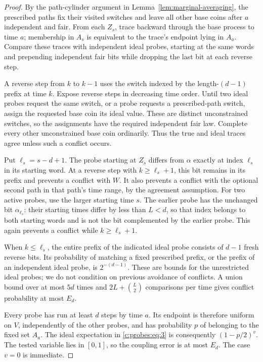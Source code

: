 \begin{proof}
\label{c:probes:p010}
By the path-cylinder argument in Lemma~\ref{lem:marginal-averaging},
the prescribed paths fix their visited switches and leave all other
base coins after $a$ independent and fair.
From each $Z_s$, trace backward through the base process to time $a$;
membership in $A_s$ is equivalent to the trace's endpoint lying in
$A_a$. Compare these traces with independent ideal probes, starting
at the same words and prepending independent fair bits while dropping
the last bit at each reverse step.

\label{c:probes:p011}
A reverse step from $k$ to $k-1$ uses the switch indexed by the
length-$(d-1)$ prefix at time $k$. Expose reverse steps in decreasing
time order. Until two ideal probes request the same switch, or a probe
requests a prescribed-path switch, assign the requested base coin its
ideal value. These are distinct unconstrained switches, so the
assignments have the required independent fair law. Complete every
other unconstrained base coin ordinarily. Thus the true and ideal
traces agree unless such a conflict occurs.

\label{c:probes:p012}
Put $\ell_s=s-d+1$. The probe starting at $Z_s$ differs from
$\alpha$ exactly at index $\ell_s$ in its starting word. At a reverse
step with $k\ge\ell_s+1$, this bit remains in its prefix and prevents
a conflict with $W$. It also prevents a conflict with the optional
second path in that path's time range, by the agreement assumption.
For two active probes, use the larger starting time $s$. The earlier
probe has the unchanged bit $\alpha_{\ell_s}$: their starting times
differ by less than $L<d$, so that index belongs to both starting
words and is not the bit complemented by the earlier probe. This again
prevents a conflict while $k\ge\ell_s+1$.

When $k\le\ell_s$, the entire prefix of the indicated ideal probe
consists of $d-1$ fresh reverse bits. Its probability of matching a
fixed prescribed prefix, or the prefix of an independent ideal probe,
is $2^{-(d-1)}$. These are bounds for the unrestricted ideal probes;
we do not condition on previous avoidance of conflicts. A union bound
over at most $5d$ times and $2L+\binom L2$ comparisons per time gives
conflict probability at most $E_d$.

Every probe has run at least $d$ steps by time $a$. Its endpoint is
therefore uniform on $V$, independently of the other probes, and has
probability $p$ of belonging to the fixed set $A_a$. The ideal
expectation in \eqref{c:probes:eq:3} is consequently $(1-p/2)^v$.
The tested variable lies in $[0,1]$, so the coupling error is at most
$E_d$. The case $v=0$ is immediate.
\end{proof}


